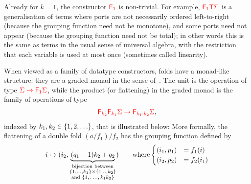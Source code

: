 Already for $k=1$, the constructor $\reduce 1$ is non-trivial. For example,  ${\color{red}{\mathsf F_{1}}}{\color{red}{\mathsf T}} {\color{red}{\Sigma}}$ is a generalisation of terms where ports are not necessarily ordered left-to-right (because the grouping function need not be monotone), and some ports need not appear (because the grouping function need not be total); in other words this is the same as terms in the usual sense of universal algebra, with the restriction that each variable is used at most once (sometimes called linearity).

When viewed as a family of datatype constructors,  folds have a monad-like structure: they are a graded  monad in the sense of~\cite[p. 518]{fujiShinyaMellies2016}. The unit is the operation 
of type ${\color{red}{\Sigma \to {\color{red}{\mathsf F_{1}}}\Sigma}}$, while  the product (or flattening) in the graded monad is the family of operations of type 
\begin{align*}
    {\color{red}{{\color{red}{\mathsf F_{k_2}}}{\color{red}{\mathsf F_{k_1}}}\Sigma \to {\color{red}{\mathsf F_{k_1 \cdot k_2}}}\Sigma}},
\end{align*}
indexed by $k_1,k_2 \in \{1,2,\ldots\}$, that is illustrated below:
More formally, the flattening of a double fold $(a/{f_1})/{f_2}$ has the grouping function defined by
\begin{align*}
i \mapsto (i_2, \underbrace{(q_1 -1)k_2 + q_2}_{\substack{\text{bijection between} \\ \{1,\ldots,k_1\} \times \{1\ldots,k_2\} \\ \text{and $\{1,\ldots,k_1k_2\}$}}}) \qquad \text{where} \begin{cases}
    (i_1,p_1) &= f_1(i)\\
    (i_2,p_2) &= f_2(i_1)
\end{cases}
\end{align*}


